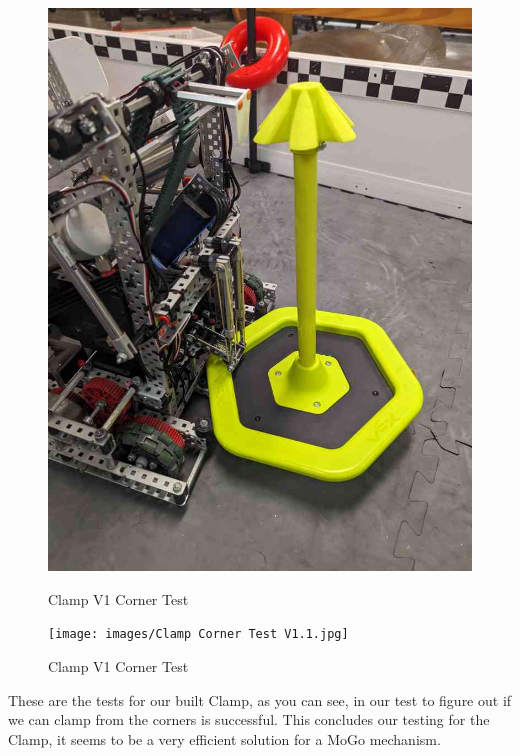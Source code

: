 \begin{figure}[h!]
\begin{minipage}{.5\textwidth}
        \includegraphics[width=.8\linewidth]{images/Clamp Corner Test V1.jpg}
        \caption{Clamp V1 Corner Test}
        \label{fig:clamp-v1-corner-test}
    \end{minipage}
    \begin{minipage}{.5\textwidth}
        \centering
        \texttt{[image: images/Clamp Corner Test V1.1.jpg]}
        \caption{Clamp V1 Corner Test}
        \label{fig:clamp-v1.1-corner-test}
    \end{minipage}
\end{figure}

These are the tests for our built Clamp, as you can see, in  our test to figure out if we can clamp from the corners is successful. This concludes our testing for the Clamp, it seems to be a very efficient solution for a MoGo mechanism. 